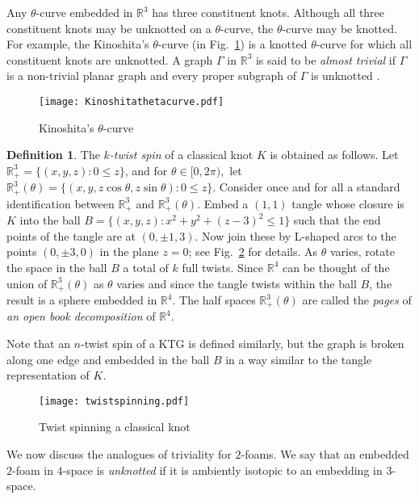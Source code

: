 \documentclass{amsart}
\newcommand{\R}{\mathbb{R}}
\theoremstyle{definition}
\newtheorem{definition}[theorem]{Definition}
\theoremstyle{remark}
\numberwithin{equation}{section}
\begin{document}
Any $\theta$-curve embedded in $\mathbb{R}^{3}$ has three constituent knots. Although all three constituent knots may be unknotted on a $\theta$-curve, the $\theta$-curve may be knotted. For example, the Kinoshita's $\theta$-curve (in Fig.~\ref{8}) is a knotted $\theta$-curve for which all constituent knots are unknotted. A graph $\Gamma$ in $\mathbb{R}^{3}$ is said to be \emph{almost trivial} if $\Gamma$ is a non-trivial planar graph and every proper subgraph of $\Gamma$ is unknotted \cite{Kaw96}.

\begin{figure}[h]
\texttt{[image: Kinoshitathetacurve.pdf]}
\caption{Kinoshita's $\theta$-curve}
\label{8}
\end{figure}

\begin{definition} The {\it $k$-twist spin} of  a classical knot $K$ is obtained as follows.
Let $\R^3_+= \{(x,y,z): 0\le z\}$, and  for $\theta \in [0, 2\pi), $ let $\R^3_+(\theta)= \{(x,y,z \cos{\theta}, z \sin{\theta}): 0\le z \}$. Consider once and for all a standard identification between $\R^3_+$ and $\R^3_+(\theta).$ Embed a $(1,1)$ tangle whose closure is $K$ into the ball $B=\{(x,y,z): x^2+y^2+(z-3)^2 \le 1 \}$ such that the end points of the tangle are at $(0,\pm 1, 3)$. Now join these by {\sf L}-shaped arcs to the points $(0,\pm 3, 0)$ in the plane $z=0$; see Fig.~\ref{Tw} for details. As $\theta$ varies, rotate the space in the ball $B$ a total of $k$ full twists. Since $\R^4$ can be thought of the union of $\R^3_+(\theta)$ as $\theta$ varies and since the tangle twists within the ball $B$, the result is a sphere embedded in $\R^4$. The half spaces $\R^3_+(\theta)$ are called the {\it pages} of {\it an open book decomposition} of $\R^4$.


Note that an $n$-twist spin of a KTG is defined similarly, but the graph is broken along one edge and embedded in the ball $B$ in a way similar to the tangle representation of $K$. \end{definition}


\begin{figure}[h]
\texttt{[image: twistspinning.pdf]}
\caption{Twist spinning a classical knot}
\label{Tw}
\end{figure}


We now discuss the analogues of triviality for $2$-foams. We say that an embedded $2$-foam in $4$-space is \emph{unknotted} if it is ambiently isotopic to an embedding in $3$-space.
\end{document}
